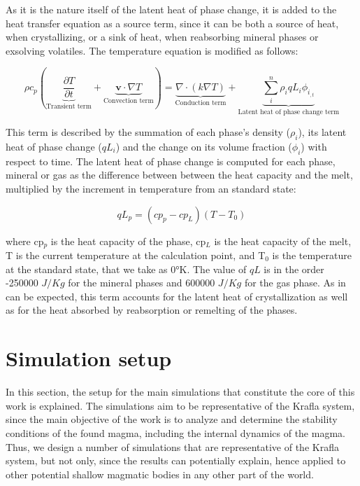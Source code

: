 As it is the nature itself of the latent heat of phase change, it is added to the heat transfer equation as a source term, since it can be both a source of heat, when crystallizing, or a sink of heat, when reabsorbing mineral phases or exsolving volatiles. The temperature equation is modified as follows:

\begin{equation}
\rho c_p \left(\underbrace{\frac{\partial T}{\partial t}}_{\text{Transient term}} + \underbrace{\mathbf{v} \cdot \nabla T }_{\text{Convection term}}\right) = \underbrace{\nabla \cdot (k \nabla T)}_{\text{Conduction term}} + \underbrace{\sum_{i}^n\rho_iqL_i\phi_{i_{,t}}}_{\text{Latent heat of phase change term}}
\end{equation}

This term is described by the summation of each phase's density ($\rho_i$), its latent heat of phase change ($qL_i$) and the change on its volume fraction ($\phi_i$) with respect to time. The latent heat of phase change is computed for each phase, mineral or gas as the difference between between the heat capacity and the melt, multiplied by the increment in temperature from an standard state:

\begin{equation}
    qL_p = (cp_p-cp_L)(T-T_0)
\end{equation}

where cp$_p$ is the heat capacity of the phase, cp$_L$ is the heat capacity of the melt, T is the current temperature at the calculation point, and T$_0$ is the temperature at the standard state, that we take as 0°K. The value of $qL$ is in the order -250000 $J/Kg$ for the mineral phases and 600000 $J/Kg$ for the gas phase. As in can be expected, this term accounts for the latent heat of crystallization as well as for the heat absorbed by reabsorption or remelting of the phases.


\section{Simulation setup}
In this section, the setup for the main simulations that constitute the core of this work is explained. The simulations aim to be representative of the Krafla system, since the main objective of the work is to analyze and determine the stability conditions of the found magma, including the internal dynamics of the magma. Thus, we design a number of simulations that are representative of the Krafla system, but not only, since the results can potentially explain, hence applied to other potential shallow magmatic bodies in any other part of the world. 


